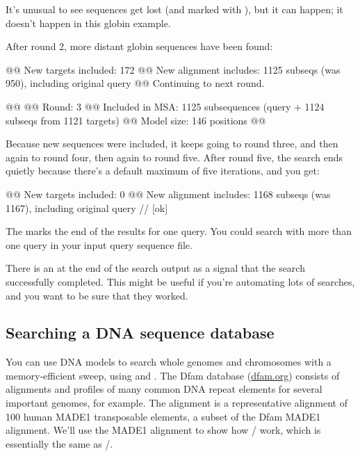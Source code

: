It's unusual to see sequences get lost (and marked with \ccode{-}),
but it can happen; it doesn't happen in this globin example.

After round 2, more distant globin sequences have been found:

\begin{samepage}
\begin{sreoutput}
@@ New targets included:   172
@@ New alignment includes: 1125 subseqs (was 950), including original query
@@ Continuing to next round.

@@
@@ Round:                  3
@@ Included in MSA:        1125 subsequences (query + 1124 subseqs from 1121 targets)
@@ Model size:             146 positions
@@
\end{sreoutput}
\end{samepage}

Because new sequences were included, it keeps going to round three,
and then again to round four, then again to round five. After round
five, the search ends quietly because there's a default maximum
of five iterations, and you get:

\begin{samepage}
\begin{sreoutput}
@@ New targets included:   0
@@ New alignment includes: 1168 subseqs (was 1167), including original query
//
[ok]
\end{sreoutput}
\end{samepage}

The \ccode{//} marks the end of the results for one query. You could
search with more than one query in your input query sequence
file. 

There is an \ccode{[ok]} at the end of the search output as a signal
that the search successfully completed. This might be useful if you're
automating lots of searches, and you want to be sure that they worked.



\subsection{Searching a DNA sequence database}

You can use DNA models to search whole genomes and chromosomes with a
memory-efficient sweep, using  and . The
Dfam database (\url{dfam.org}) consists of alignments and profiles of
many common DNA repeat elements for several important genomes, for
example.  The alignment  is a representative
alignment of 100 human MADE1 transposable elements, a subset of the
Dfam MADE1 alignment. We'll use the MADE1 alignment to show how
/ work, which is essentially the same as
/.

